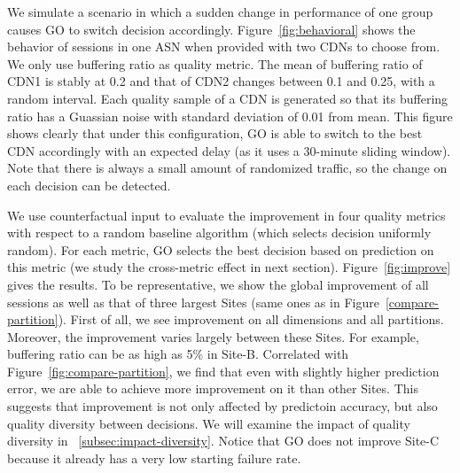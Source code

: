  We simulate a scenario in which a sudden change in performance of one group causes GO to switch decision accordingly. Figure~\ref{fig:behavioral} shows the behavior of sessions in one ASN when provided with two CDNs to choose from. We only use buffering ratio as quality metric. The mean of buffering ratio of CDN1 is stably at 0.2 and that of CDN2 changes between 0.1 and 0.25, with a random interval. Each quality sample of a CDN is generated so that its buffering ratio has a Guassian noise with standard deviation of 0.01 from mean. This figure shows clearly that under this configuration, GO is able to switch to the best CDN accordingly with an expected delay (as it uses a 30-minute sliding window). Note that there is always a small amount of randomized traffic, so the change on each decision can be detected. %




\label{subsec:go-improve}
We use counterfactual input to evaluate the improvement in four quality metrics with respect to a random baseline algorithm (which selects decision uniformly random). For each metric, GO selects the best decision based on prediction on this metric (we study the cross-metric effect in next section). Figure~\ref{fig:improve} gives the results. To be representative, we show the global improvement of all sessions as well as that of three largest Sites (same ones as in Figure~\ref{compare-partition}). First of all, we see improvement on all dimensions and all partitions. Moreover, the improvement varies largely between these Sites. For example, buffering ratio can be as high as 5\% in Site-B. Correlated with Figure~\ref{fig:compare-partition}, we find that even with slightly higher prediction error, we are able to achieve more improvement on it than other Sites. This suggests that improvement is not only affected by predictoin accuracy, but also quality diversity between decisions. We will examine the impact of quality diversity in \Section~\ref{subsec:impact-diversity}.
Notice that GO does not improve Site-C because it already has a very low starting failure rate.



